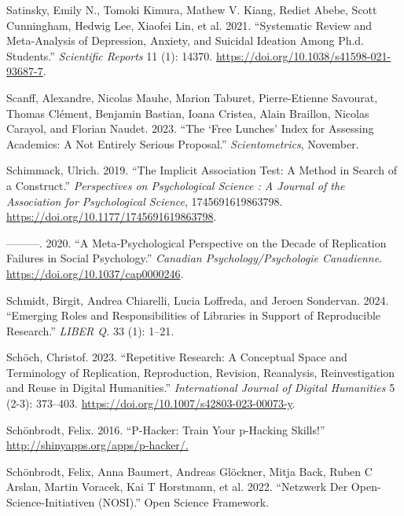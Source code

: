 \documentclass[
  letterpaper,
  DIV=11,
  numbers=noendperiod]{scrreprt}
\newlength{\cslhangindent}
\newenvironment{CSLReferences}[2] %
 {\begin{list}{}{%
  \setlength{\itemindent}{0pt}
  \setlength{\leftmargin}{0pt}
  \setlength{\parsep}{0pt}
  \ifodd #1
   \setlength{\leftmargin}{\cslhangindent}
   \setlength{\itemindent}{-1\cslhangindent}
  \fi
  \setlength{\itemsep}{#2\baselineskip}}}
 {\end{list}}
\begin{document}
\begin{CSLReferences}{1}{0}
Satinsky, Emily N., Tomoki Kimura, Mathew V. Kiang, Rediet Abebe, Scott
Cunningham, Hedwig Lee, Xiaofei Lin, et al. 2021. {``Systematic Review
and Meta-Analysis of Depression, Anxiety, and Suicidal Ideation Among
Ph.d. Students.''} \emph{Scientific Reports} 11 (1): 14370.
\url{https://doi.org/10.1038/s41598-021-93687-7}.

Scanff, Alexandre, Nicolas Mauhe, Marion Taburet, Pierre-Etienne
Savourat, Thomas Clément, Benjamin Bastian, Ioana Cristea, Alain
Braillon, Nicolas Carayol, and Florian Naudet. 2023. {``The {`Free
Lunches'} Index for Assessing Academics: A Not Entirely Serious
Proposal.''} \emph{Scientometrics}, November.

Schimmack, Ulrich. 2019. {``The Implicit Association Test: A Method in
Search of a Construct.''} \emph{Perspectives on Psychological Science :
A Journal of the Association for Psychological Science},
1745691619863798. \url{https://doi.org/10.1177/1745691619863798}.

---------. 2020. {``A Meta-Psychological Perspective on the Decade of
Replication Failures in Social Psychology.''} \emph{Canadian
Psychology/Psychologie Canadienne}.
\url{https://doi.org/10.1037/cap0000246}.

Schmidt, Birgit, Andrea Chiarelli, Lucia Loffreda, and Jeroen Sondervan.
2024. {``Emerging Roles and Responsibilities of Libraries in Support of
Reproducible Research.''} \emph{LIBER Q.} 33 (1): 1--21.

Schöch, Christof. 2023. {``Repetitive Research: A Conceptual Space and
Terminology of Replication, Reproduction, Revision, Reanalysis,
Reinvestigation and Reuse in Digital Humanities.''} \emph{International
Journal of Digital Humanities} 5 (2-3): 373--403.
\url{https://doi.org/10.1007/s42803-023-00073-y}.

Schönbrodt, Felix. 2016. {``P-Hacker: Train Your p-Hacking Skills!''}
\url{http://shinyapps.org/apps/p-hacker/.}

Schönbrodt, Felix, Anna Baumert, Andreas Glöckner, Mitja Back, Ruben C
Arslan, Martin Voracek, Kai T Horstmann, et al. 2022. {``Netzwerk Der
{Open-Science-Initiativen} ({NOSI}).''} Open Science Framework.


\end{CSLReferences}
\end{document}
